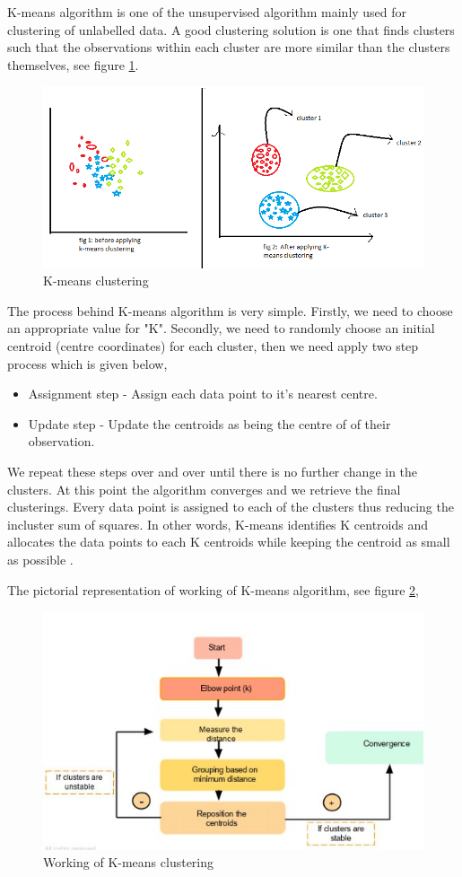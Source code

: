 \documentclass[format=sigconf]{acmart}
\begin{document}
K-means algorithm is one of the unsupervised algorithm mainly used for clustering of unlabelled data. A good clustering solution 
is one that finds clusters such that the observations within each cluster are more similar than the clusters themselves, see figure
\ref{fig:kmeans}.
\begin{figure}[H]
    \centering
    \includegraphics[scale=0.38]{kmeans.png}
    \caption{K-means clustering}
    \label{fig:kmeans}
\end{figure}
The process behind K-means algorithm is very simple. Firstly, we need to choose an appropriate value for "K". Secondly, we need to 
randomly choose an initial centroid (centre coordinates) for each cluster, then we need apply two step process which is given below,
\begin{itemize}
    \item Assignment step - Assign each data point to it's nearest centre.
    \item Update step - Update the centroids as being the centre of of their observation.
\end{itemize}
We repeat these steps over and over until there is no further change in the clusters. At this point the algorithm converges and 
we retrieve the final clusterings. Every data point is assigned to each of the clusters thus reducing the incluster sum of squares.
In other words, K-means identifies K centroids and allocates the data points to each K centroids while keeping the centroid as small
as possible \cite{kmeans}. 

The pictorial representation of working of K-means algorithm, see figure \ref{fig:kmeansworking},
\begin{figure}[H]
    \centering
    \includegraphics[scale=0.55]{kmeans_1.jpeg}
    \caption{Working of K-means clustering}
    \label{fig:kmeansworking}
\end{figure}
\end{document}
